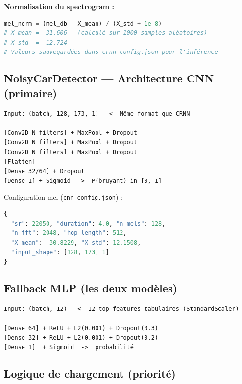 \documentclass[11pt,a4paper]{article}
\newcommand{\code}[1]{\texttt{\small #1}}
\begin{document}
\textbf{Normalisation du spectrogram :}
\begin{lstlisting}[language=Python]
mel_norm = (mel_db - X_mean) / (X_std + 1e-8)
# X_mean = -31.606   (calculé sur 1000 samples aléatoires)
# X_std  =  12.724
# Valeurs sauvegardées dans crnn_config.json pour l'inférence
\end{lstlisting}

\subsection{NoisyCarDetector — Architecture CNN (primaire)}

\begin{lstlisting}[style=tree,caption={Architecture CNN NoisyCarDetector}]
Input: (batch, 128, 173, 1)   <- Même format que CRNN

[Conv2D N filters] + MaxPool + Dropout
[Conv2D N filters] + MaxPool + Dropout
[Conv2D N filters] + MaxPool + Dropout
[Flatten]
[Dense 32/64] + Dropout
[Dense 1] + Sigmoid  ->  P(bruyant) in [0, 1]
\end{lstlisting}

Configuration mel (\code{cnn\_config.json}) :
\begin{lstlisting}[language=Python]
{
  "sr": 22050, "duration": 4.0, "n_mels": 128,
  "n_fft": 2048, "hop_length": 512,
  "X_mean": -30.8229, "X_std": 12.1508,
  "input_shape": [128, 173, 1]
}
\end{lstlisting}

\subsection{Fallback MLP (les deux modèles)}

\begin{lstlisting}[style=tree,caption={Architecture MLP fallback}]
Input: (batch, 12)   <- 12 top features tabulaires (StandardScaler)

[Dense 64] + ReLU + L2(0.001) + Dropout(0.3)
[Dense 32] + ReLU + L2(0.001) + Dropout(0.2)
[Dense 1]  + Sigmoid  ->  probabilité
\end{lstlisting}

\subsection{Logique de chargement (priorité)}
\end{document}
